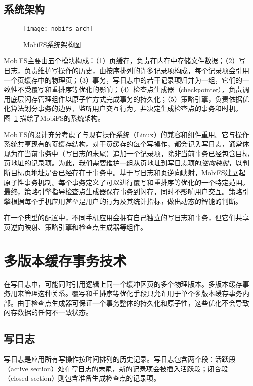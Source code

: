 \subsection{系统架构}

\begin{figure}
  \centering
  \texttt{[image: mobifs-arch]}
  \caption{MobiFS系统架构图}
  \label{fig:mobifs-arch}
\end{figure}

MobiFS主要由五个模块构成：（1）页缓存，负责在内存中存储文件数据；（2）写日志，负责维护写操作的历史，由按序排列的许多记录项构成，每个记录项会引用一个页缓存中的物理页；（3）事务，写日志中的若干记录项归并为一组，它们的一致性不受覆写和重排序等优化的影响；（4）检查点生成器（checkpointer），负责调用底层闪存管理组件以原子性方式完成事务的持久化；（5）策略引擎，负责依据优化算法划分事务的边界，监听用户交互行为，并决定生成检查点的事务和时机。图~\ref{fig:mobifs-arch} 描绘了MobiFS的系统架构。

MobiFS的设计充分考虑了与现有操作系统（Linux）的兼容和组件重用。它与操作系统共享现有的页缓存结构。对于页缓存的每个写操作，都会记入写日志，通常体现为在当前事务中（写日志的末尾）追加一个记录项，除非当前事务已经包含目标页地址的记录项。为此，我们需要维护一组从页地址到写日志项的\emph{逆向映射}，以判断目标页地址是否已经存在于事务中。基于写日志和页逆向映射，MobiFS建立起原子性事务机制。每个事务定义了可以进行覆写和重排序等优化的一个特定范围。最终，策略引擎指导检查点生成器保存事务到闪存，同时不影响用户交互。策略引擎根据每个手机应用甚至是用户的行为及其统计指标，做出动态的智能的判断。

在一个典型的配置中，不同手机应用会拥有自己独立的写日志和事务，但它们共享页逆向映射、策略引擎和检查点生成器等组件。

\section{多版本缓存事务技术}

在写日志中，可能同时引用逻辑上同一个缓冲区页的多个物理版本。多版本缓存事务用来管理这种关系。覆写和重排序等优化手段只允许用于单个多版本缓存事务内部。由于检查点生成器可保证一个事务整体的持久化和原子性，这些优化不会导致闪存数据的任何不一致状态。

\subsection{写日志}

写日志是应用所有写操作按时间排列的历史记录。写日志包含两个段：活跃段（active section）处在写日志的末尾，新的记录项会被插入活跃段；闭合段（closed section）则包含准备生成检查点的记录项。 
 
